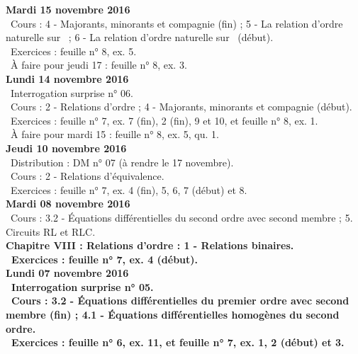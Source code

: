 \documentclass[12pt,a4paper]{article}
\begin{document}
\noindent\textbf{Mardi 15 novembre 2016}\\
\bu\ Cours : 4 - Majorants, minorants et compagnie (fin) ; 5 - La relation d'ordre naturelle sur \N\ ; 6 - La relation 
d'ordre naturelle sur \R\ (début).\\
\bu\ Exercices : feuille n° 8, ex. 5.\\
\bu\ À faire pour jeudi 17 : feuille n° 8, ex. 3.\vspace{.4cm}\\

\noindent\textbf{Lundi 14 novembre 2016}\\
\bu\ Interrogation surprise n° 06.\\
\bu\ Cours : 2 - Relations d'ordre ;  4 - Majorants, minorants et compagnie (début).\\
\bu\ Exercices : feuille n° 7, ex. 7 (fin), 2 (fin), 9 et 10, et feuille n° 8, ex. 1.\\
\bu\ À faire pour mardi 15 : feuille n° 8, ex. 5, qu. 1.\vspace{.4cm}\\

\noindent\textbf{Jeudi 10 novembre 2016}\\
\bu\ Distribution : DM n° 07 (à rendre le 17 novembre).\\
\bu\ Cours : 2 - Relations d'équivalence.\\
\bu\ Exercices : feuille n° 7, ex. 4 (fin), 5, 6, 7 (début) et 8.\vspace{.4cm}\\

\noindent\textbf{Mardi 08 novembre 2016}\\
\bu\ Cours : 3.2 - Équations différentielles du second ordre avec second membre ; 5. Circuits RL et RLC.\\
\bf Chapitre VIII \rm : Relations d'ordre : 1 - Relations binaires.\\
\bu\ Exercices : feuille n° 7, ex. 4 (début).\vspace{.4cm}\\

\noindent\textbf{Lundi 07 novembre 2016} \\
\bu\ Interrogation surprise n° 05.\\
\bu\ Cours : 3.2 - Équations différentielles du premier ordre avec second membre (fin) ; 4.1 - Équations 
différentielles homogènes du second ordre.\\
\bu\ Exercices : feuille n° 6, ex. 11, et feuille n° 7, ex. 1, 2 (début) et 3.\vspace{.4cm}\\
\end{document}
